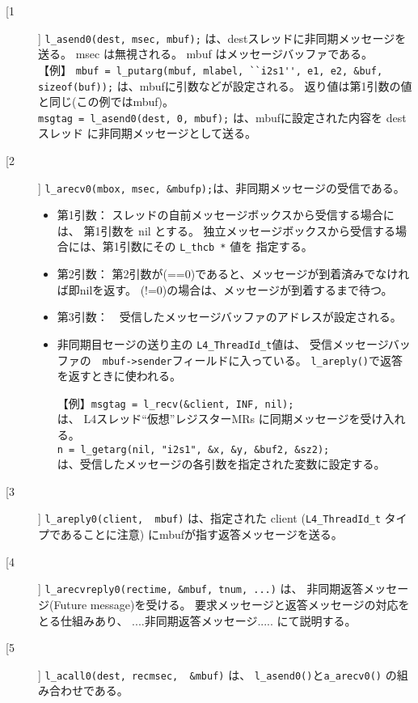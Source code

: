 \begin{description}
\item[[1]]
  \verb|l_asend0(dest, msec, mbuf);| は、destスレッドに非同期メッセージを送る。
   msec は無視される。
   mbuf はメッセージバッファである。\\

  【例】 \verb|mbuf = l_putarg(mbuf, mlabel, ``i2s1'', e1, e2, &buf, sizeof(buf));|
    は、mbufに引数などが設定される。
    返り値は第1引数の値と同じ(この例ではmbuf)。\\
    \verb|msgtag = l_asend0(dest, 0, mbuf);|
    は、mbufに設定された内容を
    destスレッド に非同期メッセージとして送る。

\item[[2]]
  \verb|l_arecv0(mbox, msec, &mbufp);|は、非同期メッセージの受信である。

  \begin{itemize}
  \item 第1引数： スレッドの自前メッセージボックスから受信する場合には、
    第1引数を nil とする。
    独立メッセージボックスから受信する場合には、第1引数にその \verb|L_thcb *| 値を
    指定する。
  \item 第2引数： 第2引数が(==0)であると、メッセージが到着済みでなければ即nilを返す。
     (!=0)の場合は、メッセージが到着するまで待つ。\\
  \item  第3引数：　受信したメッセージバッファのアドレスが設定される。

  \item  非同期目セージの送り主の \verb|L4_ThreadId_t|値は、
        受信メッセージバッファの　\verb|mbuf->sender|フィールドに入っている。
        \verb|l_areply()|で返答を返すときに使われる。

  【例】\verb|msgtag = l_recv(&client, INF, nil);| \\
     は、 L4スレッド``仮想''レジスターMRs に同期メッセージを受け入れる。\\
   \verb|n = l_getarg(nil, "i2s1", &x, &y, &buf2, &sz2);| \\
   は、受信したメッセージの各引数を指定された変数に設定する。

   \end{itemize}

\item[[3]]
  \verb|l_areply0(client,  mbuf)| は、指定された client
   (\verb|L4_ThreadId_t| タイプであることに注意)
  にmbufが指す返答メッセージを送る。

\item[[4]]
  \verb|l_arecvreply0(rectime, &mbuf, tnum, ...)| は、
  非同期返答メッセージ(Future message)を受ける。
  要求メッセージと返答メッセージの対応をとる仕組みあり、
  ....非同期返答メッセージ..... にて説明する。　　

\item[[5]]
  \verb|l_acall0(dest, recmsec,  &mbuf)| は、
   \verb|l_asend0()|と\verb|a_arecv0()| の組み合わせである。

\end{description}




